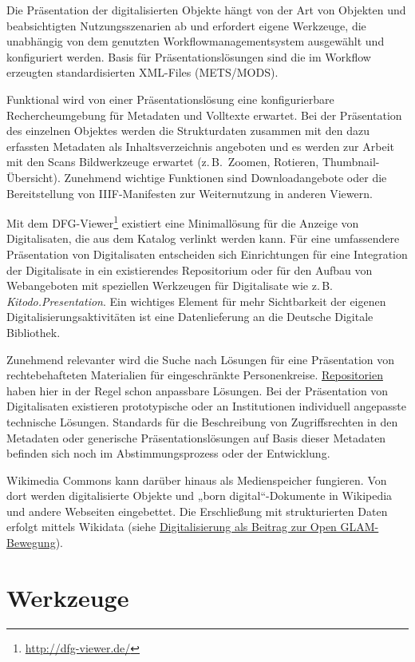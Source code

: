 \documentclass[
  11pt,
  letterpaper,
  DIV=11,
  twoside]{scrreprt}
\DeclareRobustCommand{\href}[2]{#2\footnote{\url{#1}}}
\begin{document}
Die Präsentation der digitalisierten Objekte hängt von der Art von
Objekten und beabsichtigten Nutzungsszenarien ab und erfordert eigene
Werkzeuge, die unabhängig von dem genutzten Workflowmanagementsystem
ausgewählt und konfiguriert werden. Basis für Präsentationslösungen sind
die im Workflow erzeugten standardisierten XML-Files (METS/MODS).

Funktional wird von einer Präsentationslösung eine konfigurierbare
Rechercheumgebung für Metadaten und Volltexte erwartet. Bei der
Präsentation des einzelnen Objektes werden die Strukturdaten zusammen
mit den dazu erfassten Metadaten als Inhaltsverzeichnis angeboten und es
werden zur Arbeit mit den Scans Bildwerkzeuge erwartet (z.\,B.~Zoomen,
Rotieren, Thumbnail-Übersicht). Zunehmend wichtige Funktionen sind
Downloadangebote oder die Bereitstellung von IIIF-Manifesten zur
Weiternutzung in anderen Viewern.

Mit dem \href{http://dfg-viewer.de/}{DFG-Viewer} existiert eine
Minimallösung für die Anzeige von Digitalisaten, die aus dem Katalog
verlinkt werden kann. Für eine umfassendere Präsentation von
Digitalisaten entscheiden sich Einrichtungen für eine Integration der
Digitalisate in ein existierendes Repositorium oder für den Aufbau von
Webangeboten mit speziellen Werkzeugen für Digitalisate wie z.\,B.
\emph{Kitodo.Presentation}. Ein wichtiges Element für mehr Sichtbarkeit
der eigenen Digitalisierungsaktivitäten ist eine Datenlieferung an die
Deutsche Digitale Bibliothek.

Zunehmend relevanter wird die Suche nach Lösungen für eine Präsentation
von rechtebehafteten Materialien für eingeschränkte Personenkreise.
\hyperref[repositorien-fuxfcr-forschungsergebnisse]{Repositorien} haben
hier in der Regel schon anpassbare Lösungen. Bei der Präsentation von
Digitalisaten existieren prototypische oder an Institutionen individuell
angepasste technische Lösungen. Standards für die Beschreibung von
Zugriffsrechten in den Metadaten oder generische Präsentationslösungen
auf Basis dieser Metadaten befinden sich noch im Abstimmungsprozess oder
der Entwicklung.

Wikimedia Commons kann darüber hinaus als Medienspeicher fungieren. Von
dort werden digitalisierte Objekte und „born digital``-Dokumente in
Wikipedia und andere Webseiten eingebettet. Die Erschließung mit
strukturierten Daten erfolgt mittels Wikidata (siehe
\hyperref[digitalisierung-als-beitrag-zur-open-glam-bewegung]{Digitalisierung
als Beitrag zur Open GLAM-Bewegung}).

\section{Werkzeuge}\label{werkzeuge-1}
\end{document}
